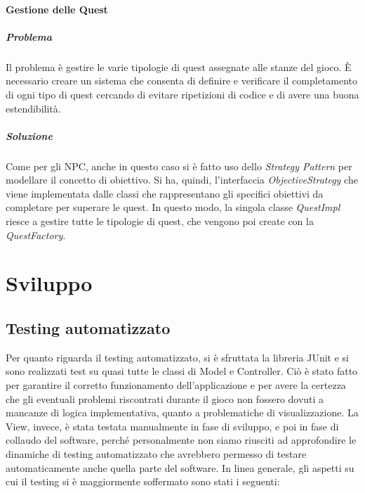 \documentclass[a4paper,12pt]{report}
\begin{document}
\subsubsection{Gestione delle Quest}
\paragraph{Problema} Il problema è gestire le varie tipologie di quest assegnate alle stanze del gioco. È necessario creare un sistema che consenta di definire 
e verificare il completamento di ogni tipo di quest cercando di evitare ripetizioni di codice e di avere una buona estendibilità.
\paragraph{Soluzione} Come per gli NPC, anche in questo caso si è fatto uso dello \textit{Strategy Pattern} per modellare il concetto di obiettivo.
Si ha, quindi, l'interfaccia \textit{ObjectiveStrategy} che viene implementata dalle classi che rappresentano gli specifici obiettivi da completare per superare le quest.
In questo modo, la singola classe \textit{QuestImpl} riesce a gestire tutte le tipologie di quest, che vengono poi create con la \textit{QuestFactory}.


\chapter{Sviluppo}

\section{Testing automatizzato}

Per quanto riguarda il testing automatizzato, si è sfruttata la libreria JUnit e si sono realizzati test su quasi tutte le classi di Model e Controller. Ciò è stato fatto per garantire il corretto funzionamento dell’applicazione e per avere la certezza che gli eventuali problemi riscontrati durante il gioco non fossero dovuti a mancanze di logica implementativa, quanto a problematiche di visualizzazione. 
%
\newline La View, invece, è stata testata manualmente in fase di sviluppo, e poi in fase di collaudo del software, perché personalmente non siamo riusciti ad approfondire le dinamiche di testing automatizzato che avrebbero permesso di testare automaticamente anche quella parte del software.
%
\newline In linea generale, gli aspetti su cui il testing si è maggiormente soffermato sono stati i seguenti:
\end{document}
